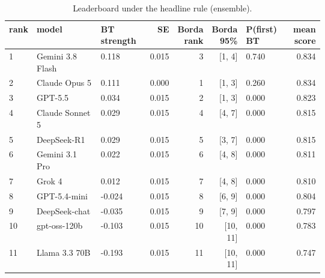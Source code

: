 \begin{table}[htbp]
\centering\tiny
\caption{Leaderboard under the headline rule (ensemble).}
\label{tab:leaderboard_headline}
\setlength{\tabcolsep}{3pt}
\begin{tabular}{lp{0.256\linewidth}p{0.176\linewidth}rrrp{0.176\linewidth}r}
\toprule
rank & model & BT strength & SE & Borda rank & Borda 95\% & P(first) BT & mean score \\
\midrule
1 & Gemini 3.8 Flash & 0.118 & 0.015 & 3 & [1, 4] & 0.740 & 0.834 \\
2 & Claude Opus 5 & 0.111 & 0.000 & 1 & [1, 3] & 0.260 & 0.834 \\
3 & GPT-5.5 & 0.034 & 0.015 & 2 & [1, 3] & 0.000 & 0.823 \\
4 & Claude Sonnet 5 & 0.029 & 0.015 & 4 & [4, 7] & 0.000 & 0.815 \\
5 & DeepSeek-R1 & 0.029 & 0.015 & 5 & [3, 7] & 0.000 & 0.815 \\
6 & Gemini 3.1 Pro & 0.022 & 0.015 & 6 & [4, 8] & 0.000 & 0.811 \\
7 & Grok 4 & 0.012 & 0.015 & 7 & [4, 8] & 0.000 & 0.810 \\
8 & GPT-5.4-mini & -0.024 & 0.015 & 8 & [6, 9] & 0.000 & 0.804 \\
9 & DeepSeek-chat & -0.035 & 0.015 & 9 & [7, 9] & 0.000 & 0.797 \\
10 & gpt-oss-120b & -0.103 & 0.015 & 10 & [10, 11] & 0.000 & 0.783 \\
11 & Llama 3.3 70B & -0.193 & 0.015 & 11 & [10, 11] & 0.000 & 0.747 \\
\bottomrule
\end{tabular}
\end{table}
